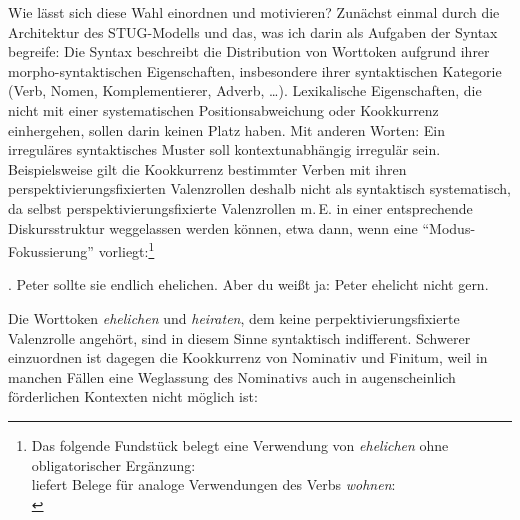 {Wie lässt sich diese Wahl einordnen und motivieren? Zunächst einmal durch die Architektur des STUG-Modells und das, was ich darin als Aufgaben der Syntax begreife: Die Syntax beschreibt die Distribution von Worttoken aufgrund ihrer morpho-syntaktischen Eigenschaften, insbesondere ihrer syntaktischen Kategorie (Verb, Nomen, Komplementierer, Adverb, \ldots). Lexikalische Eigenschaften, die nicht mit einer systematischen Positionsabweichung oder Kookkurrenz einhergehen, sollen darin keinen Platz haben. Mit anderen Worten: Ein irreguläres syntaktisches Muster soll kontextunabhängig irregulär sein. Beispielsweise gilt die Kookkurrenz bestimmter Verben mit ihren perspektivierungsfixierten Valenzrollen deshalb nicht als syntaktisch systematisch, da selbst perspektivierungsfixierte Valenzrollen m.\,E. in einer entsprechende Diskursstruktur weggelassen werden können, etwa dann, wenn eine "`Modus-Fokussierung"' \citep{Maienborn:91} vorliegt:\footnote{Das folgende Fundstück belegt eine Verwendung von {\it ehelichen} ohne obligatorischer Ergänzung:\\
\citet[24, Fußnote~14]{Mueller:10} liefert Belege für analoge Verwendungen des Verbs {\it wohnen}:\\
}   

\ex. Peter sollte sie endlich ehelichen. Aber du wei\ss t ja: Peter ehelicht nicht gern. 

Die Worttoken {\it ehelichen} und {\it heiraten}, dem keine perpektivierungsfixierte Valenzrolle angehört, sind in diesem Sinne syntaktisch indifferent. Schwerer einzuordnen ist dagegen die Kookkurrenz von Nominativ und Finitum, weil in manchen Fällen eine Weglassung des Nominativs auch in augenscheinlich förderlichen Kontexten nicht möglich ist:

}
